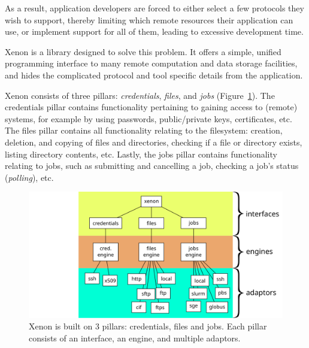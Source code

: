 \documentclass[12pt, a4paper, twoside, openany, titlepage]{book}
\begin{document}
As a result, application developers are forced to either select a few protocols they wish to support, thereby limiting which remote resources their application can use, or implement support for all of them, leading to excessive development time.

Xenon is a library designed to solve this problem. It offers a simple, unified programming interface to many remote computation and data storage facilities, and hides the complicated protocol and tool specific details from the application.

Xenon consists of three pillars: \textit{credentials}, \textit{files}, and \textit{jobs} (Figure~\ref{fig:xenon-design}).
%
The credentials pillar contains functionality pertaining to gaining access to (remote) systems, for example by using passwords, public/private keys, certificates, etc.
%
The files pillar contains all functionality relating to the filesystem: creation, deletion, and copying of files and directories, checking if a file or directory exists, listing directory contents, etc.
%
Lastly, the jobs pillar contains functionality relating to jobs, such as submitting and cancelling a job, checking a job's status (\textit{polling}), etc.

\begin{figure}[ht]
\centering
\includegraphics[width=1.0\columnwidth]{images/xenon-design}
\caption{\label{fig:xenon-design} Xenon is built on 3 pillars: credentials, files and jobs. Each pillar consists of an interface, an engine, and multiple adaptors.}
\end{figure}
\end{document}
